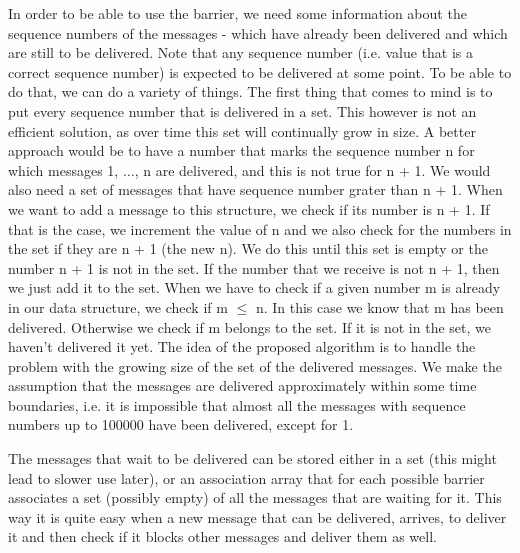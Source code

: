 \documentclass[12pt]{article}
\theoremstyle{plain}
\begin{document}
In order to be able to use the barrier, we need some information about the 
sequence numbers of the messages - which have already been delivered and which
are still to be delivered. Note that any sequence number (i.e. value that is a
correct sequence number) is expected to be delivered at some point. To be able
to do that, we can do a variety of things. The first thing that comes to mind 
is to put every sequence number that is delivered in a set. This however is not
an efficient solution, as over time this set will continually grow in size.
A better approach would be to have a number that marks the sequence number n
for which messages 1, $\dots$, n are delivered, and this is not true for n + 1.
We would also need a set of messages that have sequence number grater than 
n + 1. When we want to add a message to this structure, we check if its number
is n + 1. If that is the case, we increment the value of n and we also check
for the numbers in the set if they are n + 1 (the new n). We do this until
this set is empty or the number n + 1 is not in the set. 
If the number that we receive is not n + 1, then we just add it to the set.
When we have to check if a given number m is already in our data structure,
we check if m $\le$ n. In this case we know that m has been delivered. Otherwise
we check if m belongs to the set. If it is not in the set, we haven't delivered
it yet.
The idea of the proposed algorithm is to handle the problem with the growing
size of the set of the delivered messages. We make the assumption that the
messages are delivered approximately within some time boundaries, i.e. it is
impossible that almost all the messages with sequence numbers up to 100000
have been delivered, except for 1.

The messages that wait to be delivered can be stored either in a set (this
might lead to slower use later), or an association array that for each possible
barrier associates a set (possibly empty) of all the messages that are waiting
for it. This way it is quite easy when a new message that can be delivered,
arrives, to deliver it and then check if it blocks other messages and 
deliver them as well.
\end{document}
